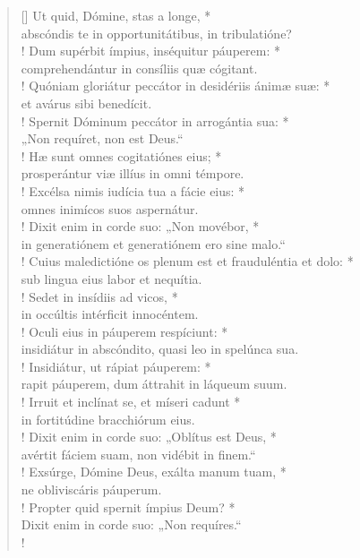 \begin{verse}[\versewidth]
Ut quid, Dómine, stas a longe, *\\
abscóndis te in opportunitátibus, in tribulatióne?\\!
\vin Dum supérbit ímpius, inséquitur páuperem: *\\
\vin comprehendántur in consíliis quæ cógitant.\\!
Quóniam gloriátur peccátor in desidériis ánimæ suæ: *\\
et avárus sibi benedícit.\\!
\vin Spernit Dóminum peccátor in arrogántia sua: *\\
\vin „Non requíret, non est Deus.“\\!
Hæ sunt omnes cogitatiónes eius; *\\
prosperántur viæ illíus in omni témpore.\\!
\vin Excélsa nimis iudícia tua a fácie eius: *\\
\vin omnes inimícos suos aspernátur.\\!
Dixit enim in corde suo: „Non movébor, *\\
in generatiónem et generatiónem ero sine malo.“\\!
\vin Cuius maledictióne \verselinebreak os plenum est et frauduléntia et dolo: *\\
\vin sub lingua eius labor et nequítia.\\!
Sedet in insídiis ad vicos, *\\
in occúltis intérficit innocéntem.\\!
\vin Oculi eius in páuperem respíciunt: *\\
\vin insidiátur in abscóndito, quasi leo in spelúnca sua.\\!
Insidiátur, ut rápiat páuperem: *\\
rapit páuperem, dum áttrahit in láqueum suum.\\!
\vin Irruit et inclínat se, et míseri cadunt *\\
\vin in fortitúdine bracchiórum eius.\\!
Dixit enim in corde suo: „Oblítus est Deus, *\\
avértit fáciem suam, non vidébit in finem.“\\!
\vin Exsúrge, Dómine Deus, exálta manum tuam, *\\
\vin ne obliviscáris páuperum.\\!
Propter quid spernit ímpius Deum? *\\
Dixit enim in corde suo: „Non requíres.“\\!

\end{verse}
